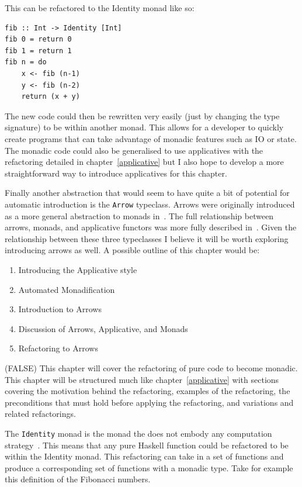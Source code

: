 This can be refactored to the Identity monad like so:\pagebreak

\begin{lstlisting}[frame=tblr]
fib :: Int -> Identity [Int]
fib 0 = return 0
fib 1 = return 1
fib n = do
	x <- fib (n-1)
	y <- fib (n-2)
	return (x + y)
\end{lstlisting}

The new code could then be rewritten very easily (just by changing the type signature) to be within another monad. This allows for a developer to quickly create programs that can take advantage of monadic features such as IO or state. The monadic code could also be generalised to use applicatives with the refactoring detailed in chapter~\ref{applicative} but I also hope to develop a more straightforward way to introduce applicatives for this chapter.

Finally another abstraction that would seem to have quite a bit of potential for automatic introduction is the \texttt{Arrow} typeclass. Arrows were originally introduced as a more general abstraction to monads in~\cite{genMonadsArrows}. The full relationship between arrows, monads, and applicative functors was more fully described in~\cite{arrowsAndIdioms}. Given the relationship between these three typeclasses I believe it will be worth exploring introducing arrows as well. A possible outline of this chapter would be:

\begin{enumerate}
\item Introducing the Applicative style
\item Automated Monadification
\item Introduction to Arrows
\item Discussion of Arrows, Applicative, and Monads
\item Refactoring to Arrows
\end{enumerate} 

\if(FALSE)
This chapter will cover the refactoring of pure code to become monadic. This chapter will be structured much like chapter~\ref{applicative} with sections covering the motivation behind the refactoring, examples of the refactoring, the preconditions that must hold before applying the refactoring, and variations and related refactorings. 

The \texttt{Identity} monad is the monad the does not embody any computation strategy~\citep{identityMonad}. This means that any pure Haskell function could be refactored to be within the Identity monad. This refactoring can take in a set of functions and produce a corresponding set of functions with a monadic type. Take for example this definition of the Fibonacci numbers.

